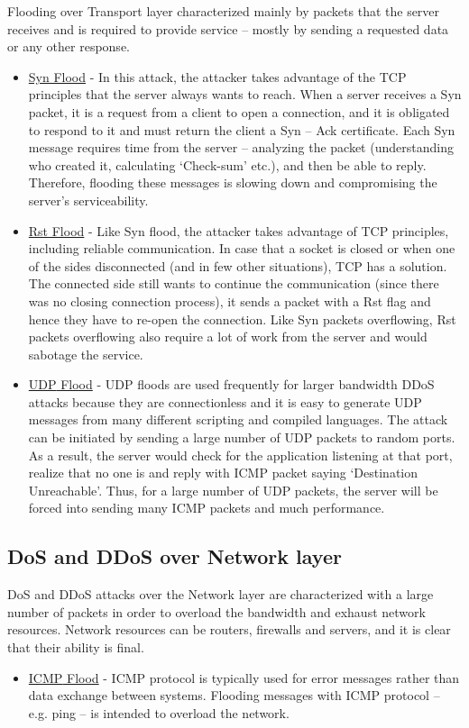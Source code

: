 \documentclass{report}
\begin{document}
 Flooding over Transport layer characterized mainly by packets that the server receives and is required to provide service – mostly by sending a requested data or any other response\cite{QuickGuide}.
\begin{itemize}
 \item\underline{Syn Flood} - In this attack, the attacker takes advantage of the \gls{TCP} principles that the server always wants to reach. When a server receives a Syn packet, it is a request from a client to open a connection, and it is obligated to respond to it and must return the client a Syn – Ack certificate. Each Syn message requires time from the server – analyzing the packet (understanding who created it, calculating ‘Check-sum’ etc.), and then be able to reply. Therefore, flooding these messages is slowing down and compromising the server’s serviceability.

\item\underline{Rst Flood} - Like Syn flood, the attacker takes advantage of \gls{TCP} principles, including reliable communication. In case that a socket is closed or when one of the sides disconnected (and in few other situations), \gls{TCP} has a solution. The connected side still wants to continue the communication (since there was no closing connection process), it sends a packet with a Rst flag and hence they have to re-open the connection. Like Syn packets overflowing, Rst packets overflowing also require a lot of work from the server and would sabotage the service.

\item\underline{\gls{UDP} Flood} - \gls{UDP} floods are used frequently for larger bandwidth \gls{DDoS} attacks because they are connectionless and it is easy to generate \gls{UDP} messages from many different scripting and compiled languages. The attack can be initiated by sending a large number of \gls{UDP} packets to random ports. As a result, the server would check for the application listening at that port, realize that no one is and reply with \gls{ICMP} packet saying ‘Destination Unreachable’. Thus, for a large number of \gls{UDP} packets, the server will be forced into sending many \gls{ICMP} packets and much performance.
\end{itemize}
\newpage
\subsection {DoS and DDoS over Network layer} 

 \hfill \break \gls{DoS} and \gls{DDoS} attacks over the Network layer are characterized with a large number of packets in order to overload the bandwidth and exhaust network resources. Network resources can be routers, firewalls and servers, and it is clear that their ability is final.
\begin{itemize}
\item\underline{\gls{ICMP} Flood} - \gls{ICMP} protocol is typically used for error messages rather than data exchange between systems. Flooding messages with \gls{ICMP} protocol – e.g. ping – is intended to overload the network.
\end{itemize}
 \hfill \break
\end{document}
